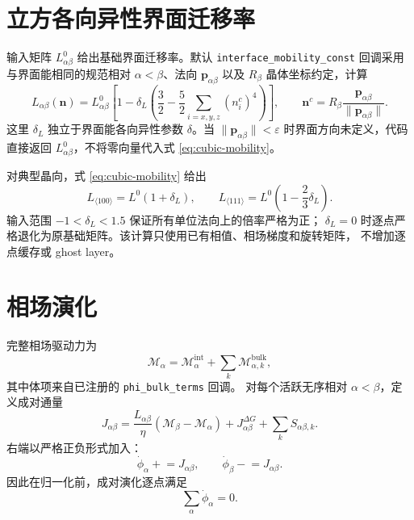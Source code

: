 \documentclass[UTF8,a4paper,11pt]{ctexart}
\newcommand{\vct}[1]{\bm{#1}}
\begin{document}
\section{立方各向异性界面迁移率}

输入矩阵 \(L^0_{\alpha\beta}\) 给出基础界面迁移率。默认
\texttt{interface\_mobility\_const} 回调采用与界面能相同的规范相对
\(\alpha<\beta\)、法向 \(\vct p_{\alpha\beta}\) 以及 \(R_\beta\) 晶体坐标约定，计算
\begin{equation}
 L_{\alpha\beta}(\vct n)
 =L^0_{\alpha\beta}
 \left[1-\delta_L\left(
 \frac32-\frac52\sum_{i=x,y,z}(n_i^c)^4
 \right)\right],
 \qquad
 \vct n^c=R_\beta\frac{\vct p_{\alpha\beta}}
 {\lVert\vct p_{\alpha\beta}\rVert}.
 \label{eq:cubic-mobility}
\end{equation}
这里 \(\delta_L\) 独立于界面能各向异性参数 \(\delta\)。当
\(\lVert\vct p_{\alpha\beta}\rVert<\varepsilon\) 时界面方向未定义，代码直接返回
\(L^0_{\alpha\beta}\)，不将零向量代入式 \eqref{eq:cubic-mobility}。

对典型晶向，式 \eqref{eq:cubic-mobility} 给出
\begin{equation}
 L_{\langle100\rangle}=L^0(1+\delta_L),\qquad
 L_{\langle111\rangle}=L^0\left(1-\frac23\delta_L\right).
\end{equation}
输入范围 \(-1<\delta_L<1.5\) 保证所有单位法向上的倍率严格为正；
\(\delta_L=0\) 时逐点严格退化为原基础矩阵。该计算只使用已有相值、相场梯度和旋转矩阵，
不增加逐点缓存或 ghost layer。

\section{相场演化}

完整相场驱动力为
\begin{equation}
 \mathcal M_\alpha
 =\mathcal M_\alpha^{\mathrm{int}}
 +\sum_k \mathcal M_{\alpha,k}^{\mathrm{bulk}},
\end{equation}
其中体项来自已注册的 \texttt{phi\_bulk\_terms} 回调。
对每个活跃无序相对 \(\alpha<\beta\)，定义成对通量
\begin{equation}
 J_{\alpha\beta}
 =\frac{L_{\alpha\beta}}{\eta}
 \left(\mathcal M_\beta-\mathcal M_\alpha\right)
 +J_{\alpha\beta}^{\Delta G}
 +\sum_k S_{\alpha\beta,k}.
\end{equation}
右端以严格正负形式加入：
\begin{equation}
 \dot\phi_\alpha\mathrel{+}=J_{\alpha\beta},\qquad
 \dot\phi_\beta\mathrel{-}=J_{\alpha\beta}.
\label{eq:antisymmetric}
\end{equation}
因此在归一化前，成对演化逐点满足
\[
 \sum_\alpha\dot\phi_\alpha=0.
\]
\end{document}
